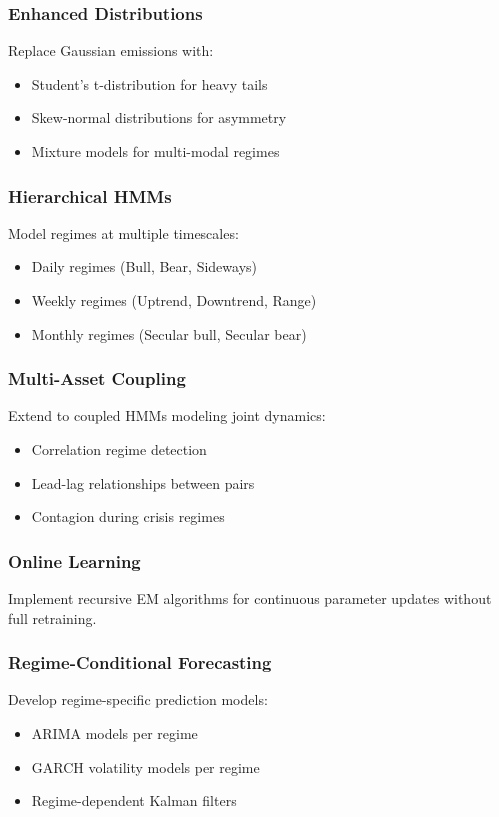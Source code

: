 \documentclass[conference]{IEEEtran}
\begin{document}
\subsubsection{Enhanced Distributions}
Replace Gaussian emissions with:
\begin{itemize}
\item Student's t-distribution for heavy tails
\item Skew-normal distributions for asymmetry
\item Mixture models for multi-modal regimes
\end{itemize}

\subsubsection{Hierarchical HMMs}
Model regimes at multiple timescales:
\begin{itemize}
\item Daily regimes (Bull, Bear, Sideways)
\item Weekly regimes (Uptrend, Downtrend, Range)
\item Monthly regimes (Secular bull, Secular bear)
\end{itemize}

\subsubsection{Multi-Asset Coupling}
Extend to coupled HMMs modeling joint dynamics:
\begin{itemize}
\item Correlation regime detection
\item Lead-lag relationships between pairs
\item Contagion during crisis regimes
\end{itemize}

\subsubsection{Online Learning}
Implement recursive EM algorithms for continuous parameter updates without full retraining.

\subsubsection{Regime-Conditional Forecasting}
Develop regime-specific prediction models:
\begin{itemize}
\item ARIMA models per regime
\item GARCH volatility models per regime
\item Regime-dependent Kalman filters
\end{itemize}
\end{document}
